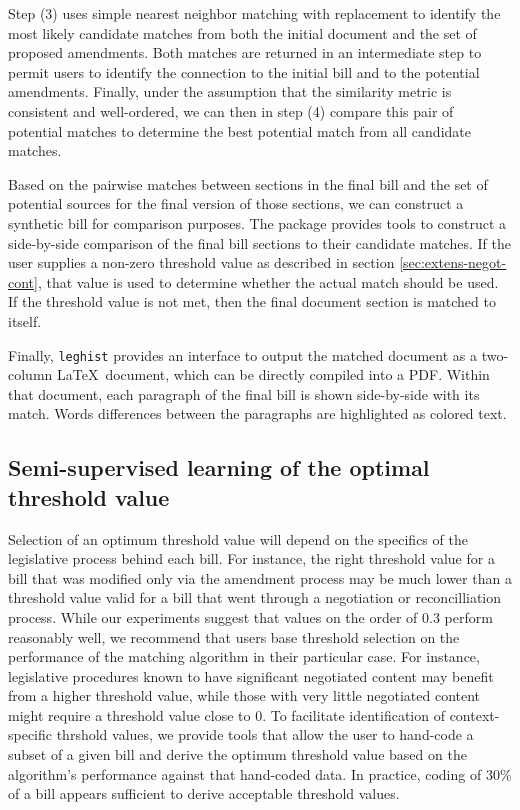 \documentclass[11pt]{article}
\begin{document}
Step (3) uses simple nearest neighbor matching with replacement to
identify the most likely candidate matches from both the initial
document and the set of proposed amendments. Both matches are returned in an
intermediate step to permit users to identify the connection to the
initial bill and to the potential amendments. Finally, under the
assumption that the similarity metric is consistent and well-ordered, we can then in step (4) compare
this pair of potential matches to determine the best potential match
from all candidate matches. 

Based on the pairwise matches between sections in the final bill and
the set of potential sources for the final version of those sections,
we can construct a synthetic bill for comparison purposes. The package
provides tools to construct a side-by-side comparison of the final
bill sections to their candidate matches. If the user supplies a
non-zero threshold value as described in section
\ref{sec:extens-negot-cont}, that
value is used to determine whether the actual match
should be used. If the threshold value is not met, then the final
document section is matched to itself. 

Finally, \texttt{leghist} provides an interface to output the matched
document as a two-column \LaTeX\ document, which can be directly
compiled into a PDF. Within that document, each paragraph of the final
bill is shown side-by-side with its match. Words differences between
the paragraphs are highlighted as colored text. 

\subsection{Semi-supervised learning of the optimal threshold value}
\label{sec:superv-learn-optim}

Selection of an optimum threshold value will depend on the specifics
of the legislative process behind each bill. For instance, the right
threshold value for a bill that was modified only via the amendment
process may be much lower than a threshold value valid for a bill that
went through a negotiation or reconcilliation process. While our experiments
suggest that values on the order of 0.3 perform reasonably well, we
recommend that users base threshold selection on the performance of
the matching algorithm in their particular case. For instance,
legislative procedures known to have significant negotiated content
may benefit from a higher threshold value, while those with very
little negotiated content might require a threshold value close to
0. To facilitate identification of context-specific thrshold values, we provide tools that allow the user to
hand-code a subset of a given bill and derive the optimum threshold
value based on the algorithm's performance against that hand-coded
data. In practice, coding of 30\% of a bill appears sufficient to
derive acceptable threshold values.
\end{document}
